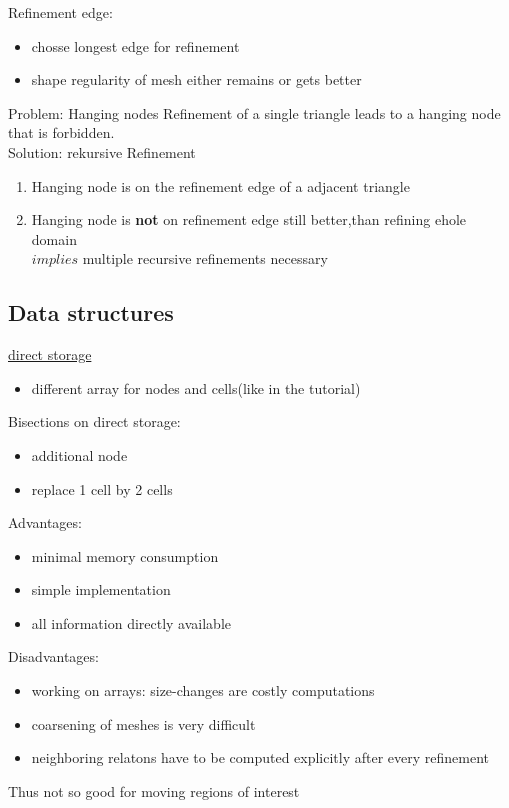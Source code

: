 Refinement edge:
\begin{itemize}
	\item chosse longest edge for refinement
	\item shape regularity of mesh either remains or gets better
\end{itemize}

Problem: Hanging nodes
Refinement of a single triangle leads to a hanging node that is forbidden.\\
Solution: rekursive Refinement\\
\begin{enumerate}[label= case \arabic*:]
	\item Hanging node is on the refinement edge of a adjacent triangle
	\item Hanging node is \textbf{not} on refinement edge
	still better,than refining ehole domain\\
	$implies$ multiple recursive refinements necessary
\end{enumerate}

\subsection{Data structures}
\underline{direct storage}\\
\begin{itemize}
	\item different array for nodes and cells(like in the tutorial)
\end{itemize}
Bisections on direct storage:
\begin{itemize}
	\item additional node
	\item replace 1 cell by 2 cells
\end{itemize}

Advantages:
\begin{itemize}
	\item minimal memory consumption
	\item simple implementation
	\item all information directly available
\end{itemize}

Disadvantages:
\begin{itemize}
	\item working on arrays: size-changes are costly computations
	\item coarsening of meshes is very difficult
	\item neighboring relatons have to be computed explicitly after every refinement
\end{itemize}
Thus not so good for moving regions of interest

